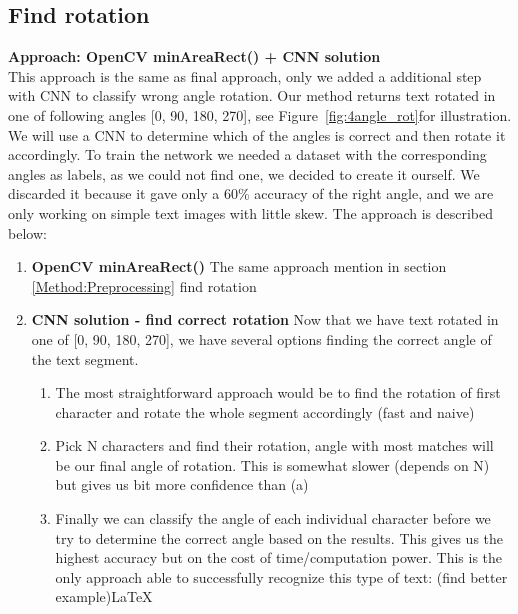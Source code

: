 \documentclass[Report.tex]{subfiles}
\begin{document}
\subsection{Find rotation}
\label{Discard:rotation}
\begin{flushleft}
  \textbf{Approach: OpenCV minAreaRect() + CNN solution} \\
  This approach is the same as final approach, only we added a additional step with CNN to classify wrong angle rotation. Our method returns text rotated in one of following angles [0\textdegree, 90\textdegree, 180\textdegree, 270\textdegree], see Figure~\ref{fig:4angle_rot}for illustration. We will use a CNN to determine which of the angles is correct and then rotate it accordingly.
  To train the network we needed a dataset with the corresponding angles as labels, as we could not find one, we decided to create it ourself. We discarded it because it gave only a 60\% accuracy of the right angle, and we are only working on simple text images with little skew. The approach is described below: 
  \begin{enumerate}
    \item \textbf{OpenCV minAreaRect()}
    The same approach mention in section \ref{Method:Preprocessing} find rotation
    \item \textbf{CNN solution - find correct rotation}
    Now that we have text rotated in one of [0\textdegree, 90\textdegree, 180\textdegree, 270\textdegree], we have several options finding the correct angle of the text segment.
    \begin{enumerate}
      \item{The most straightforward approach would be to find the rotation of first character and rotate the whole segment accordingly (fast and naive)}
      \item{Pick N characters and find their rotation, angle with most matches will be our final angle of rotation. This is somewhat slower (depends on N) but gives us bit more confidence than (a)}
      \item{Finally we can classify the angle of each individual character before we try to determine the correct angle based on the results. This gives us the highest accuracy but on the cost of time/computation power. This is the only approach able to successfully recognize this type of text: (find better example)\LaTeX}
      \end{enumerate}
    \end{enumerate}


\end{flushleft}
\end{document}
